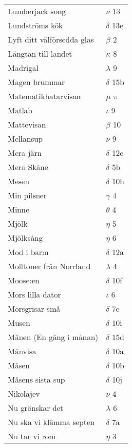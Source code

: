 \documentclass[a6paper,10pt]{article}
\begin{document}
\newpage
\begin{table}[!h]
\begin{tabular}{l l}
Lumberjack song	&$\nu$ 13\\
Lundströms kök	&$\delta$ 13e\\
Lyft ditt välförsedda glas&	$\beta$ 2\\
Längtan till landet&	$\kappa$ 8\\
Madrigal&	$\lambda$ 9\\
Magen brummar&	$\delta$ 15b\\
Matematikhatarvisan& $\mu$ $\pi$\\
Matlab	&$\iota$ 9\\
Mattevisan&	$\beta$ 10\\
Mellansup	&$\nu$ 9\\
Mera järn&	$\delta$ 12c\\
Mera Skåne	&$\delta$ 5b\\
Mesen&	$\delta$ 10h\\
Min pilsner	&$\gamma$ 4\\
Minne&	$\theta$ 4\\
Mjölk	&$\eta$ 5\\
Mjölksång&	$\eta$ 6\\
Mod i barm&$\delta$ 12a\\
Molltoner från Norrland&	$\lambda$ 4\\
Moose:en	&$\delta$ 10f\\
Mors lilla dator&	$\iota$ 6\\
Morsgrisar små&	$\delta$ 7e\\
Musen	&$\delta$ 10i\\
Månen (En gång i månan)&	$\delta$ 15d\\
Månvisa&	$\delta$ 10a\\
Måsen	&$\delta$ 10b\\
Måsens sista sup&	$\delta$ 10j\\
Nikolajev	&$\nu$ 4\\
Nu grönskar det&	$\lambda$ 6\\
Nu ska vi klämma septen	&$\delta$ 7a\\
Nu tar vi rom&	$\eta$ 3\\
\end{tabular}
\end{table}
\end{document}
